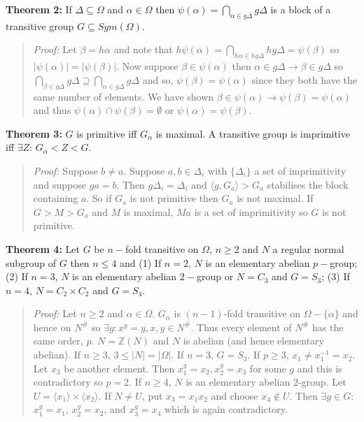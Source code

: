 {\bf Theorem 2:}
If $\Delta \subseteq \Omega$ and $\alpha \in \Omega$ then 
$\psi( \alpha ) = \bigcap_{\alpha \in g \Delta} g \Delta$ is a block of a transitive
group $G \subseteq Sym(\Omega)$.
\begin{quote}
\emph{Proof:}  
Let $\beta= h \alpha$ and
note that 
$h \psi( \alpha ) = \bigcap_{h \alpha \in hg \Delta} hg \Delta= \psi( \beta )$ so
$ |\psi( \alpha )|= |\psi( \beta )| $.   Now suppose $\beta \in \psi( \alpha )$ then
$\alpha \in g \Delta \rightarrow \beta \in g \Delta$ so 
$\bigcap_{\beta \in g \Delta} g \Delta \supseteq \bigcap_{\alpha \in g \Delta} g \Delta$ and
so, $\psi( \beta ) = \psi ( \alpha )$ since they both have the same number of elements.  We have
shown $\beta \in \psi( \alpha ) \rightarrow  \psi( \beta ) = \psi( \alpha )$ and thus
$\psi( \alpha ) \cap \psi( \beta ) = \emptyset$  or 
$\psi( \alpha ) = \psi( \beta )$.
\end{quote}
{\bf Theorem 3:}
$G$ is primitive iff $G_{\alpha}$ is maximal.
A transitive group is imprimitive iff $\exists Z$: $G_{\alpha} < Z < G$.
\begin{quote}
\emph{Proof:}  
Suppose $b \ne a$.  Suppose $a, b \in \Delta_i$ with $\{ \Delta_i \}$ a set of
imprimitivity and suppose $g a= b$.  Then $g \Delta_i = \Delta_i$ and 
$ \langle g, G_a \rangle > G_a$
stabilises the block containing $a$.  So if $G_a$ is not primitive then $G_a$ is not maximal.
If $G > M > G_a$ and $M$ is maximal, $Ma$ is a set of imprimitivity so $G$ is not primitive.
\end{quote}
{\bf Theorem 4:}  Let $G$ be $n-$fold transitive on $\Omega$, $n \ge 2$ and $N$ a regular
normal subgroup of $G$ then $n \le 4$ and 
(1) If $n=2$, $N$ is an elementary abelian $p-$group; 
(2) If $n=3$, $N$ is an elementary abelian $2-$group or $N=C_3$ and $G=S_3$;
(3) If $n=4$, $N= C_2 \times C_2$ and $G=S_4$.
\begin{quote}
\emph{Proof:}  
Let $n \geq 2$ and $\alpha \in \Omega$.  $G_{\alpha}$ is $(n-1)$-fold transitive on $\Omega - \{ \alpha \}$ and
hence on $N^{\#}$ so $\exists g: x^g=y, x,y \in N^{\#}$.  Thus every element of $N^{\#}$ has the same order, $p$.
$N= {\mathbb Z}(N)$ and $N$ is abelian (and hence elementary abelian).
If $n \geq 3$, $3 \leq |N|=|\Omega|$.  If $n=3$, $G=S_3$.  If $p \geq 3$, $x_1 \neq x_1^{-1}=x_2$.  Let $x_3$ be another 
element.  Then $x_1^g= x_2, x_2^g=x_3$ for some $g$ and this is contradictory so $p=2$.
If $n \geq 4$, $N$ is an elementary abelian $2$-group.  Let $U= \langle x_1 \rangle \times \langle x_2 \rangle$.
If $N \neq U$, put $x_3=x_1 x_2$ and choose $x_4 \notin U$.  Then $\exists g \in G:$
$x_1^g= x_1$,
$x_2^g= x_2$, and
$x_3^g= x_4$ which is again contradictory.
\end{quote}
